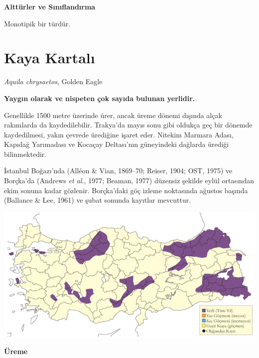 \documentclass[
  a4paper,
  DIV=11,
  numbers=noendperiod]{scrreprt}
\begin{document}
\textbf{Alttürler ve Sınıflandırma}

Monotipik bir türdür.

\section{Kaya Kartalı}\label{kaya-kartalux131}

\emph{Aquila chrysaetos}, Golden Eagle

\textbf{Yaygın olarak ve nispeten çok sayıda bulunan yerlidir.}

Genellikle 1500 metre üzerinde ürer, ancak üreme dönemi dışında alçak
rakımlarda da kaydedilebilir. Trakya'da mayıs sonu gibi oldukça geç bir
dönemde kaydedilmesi, yakın çevrede ürediğine işaret eder. Nitekim
Marmara Adası, Kapıdağ Yarımadası ve Kocaçay Deltası'nın güneyindeki
dağlarda ürediği bilinmektedir.

İstanbul Boğazı'nda (Alléon \& Vian, 1869--70; Reiser, 1904; OST, 1975)
ve Borçka'da (Andrews \emph{et al.}, 1977; Beaman, 1977) düzensiz
şekilde eylül ortasından ekim sonuna kadar gözlenir. Borçka'daki göç
izleme noktasında ağustos başında (Ballance \& Lee, 1961) ve şubat
sonunda kayıtlar mevcuttur.

\includegraphics{images/harita_Page_096.png}

\textbf{Üreme}
\end{document}
